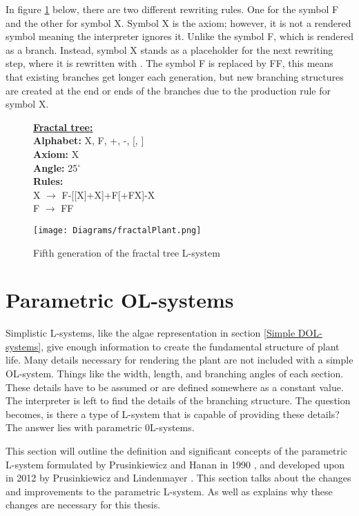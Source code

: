 \noindent
In figure \ref{fractal plant} below, there are two different rewriting rules. One for the symbol F and the other for symbol X. Symbol X is the axiom; however, it is not a rendered symbol meaning the interpreter ignores it. Unlike the symbol F, which is rendered as a branch. Instead, symbol X stands as a placeholder for the next rewriting step, where it is rewritten with . The symbol F is replaced by FF, this means that existing branches get longer each generation, but new branching structures are created at the end  or ends of the branches due to the production rule for symbol X.  

\begin{figure}[htbp]
	\raggedright
	\textbf{\underline{Fractal tree:}} \\
	\textbf{Alphabet:} X, F, +, -, [, ] \\
	\textbf{Axiom:} X \\
	\textbf{Angle:} 25$^\circ$ \\
	\textbf{Rules:} \\
	X $\rightarrow$ F-[[X]+X]+F[+FX]-X\\
	F $\rightarrow$ FF \\
	{\centering
		\vspace{7px}
		\texttt{[image: Diagrams/fractalPlant.png]}
		\caption{Fifth generation of the fractal tree L-system} \label{fractal plant}
	}
\end{figure}
\FloatBarrier

\section{Parametric OL-systems} \label{parametric}

Simplistic L-systems, like the algae representation in section \ref{Simple DOL-systems}, give enough information to create the fundamental structure of plant life. Many details necessary for rendering the plant are not included with a simple OL-system. Things like the width, length, and branching angles of each section. These details have to be assumed or are defined somewhere as a constant value. The interpreter is left to find the details of the branching structure. The question becomes, is there a type of L-system that is capable of providing these details? The answer lies with parametric 0L-systems.

This section will outline the definition and significant concepts of the parametric L-system formulated by Prusinkiewicz and Hanan in 1990 \cite{prusinkiewicz1990visualization}, and developed upon in 2012 by Prusinkiewicz and Lindenmayer \cite{prusinkiewicz2012algorithmic}. This section talks about the changes and improvements to the parametric L-system. As well as explains why these changes are necessary for this thesis.

